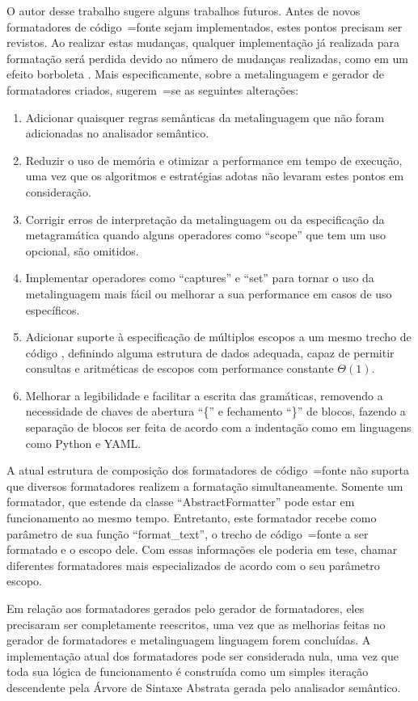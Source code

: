 O autor desse trabalho sugere alguns trabalhos futuros.
Antes de novos formatadores de código~=fonte sejam implementados,
estes pontos precisam ser revistos.
Ao realizar estas mudanças,
qualquer implementação já realizada para formatação será perdida devido ao número de mudanças realizadas,
como em um efeito borboleta \cite{standardButterflyEffect}.
Mais especificamente,
sobre a metalinguagem e
gerador de formatadores criados,
sugerem~=se as seguintes alterações:
\begin{enumerate}
\item Adicionar quaisquer regras semânticas da metalinguagem que não foram adicionadas no analisador semântico.
\item Reduzir o uso de memória e
otimizar a performance em tempo de execução,
uma vez que os algoritmos e
estratégias adotas não levaram estes pontos em consideração.
\item Corrigir erros de interpretação da metalinguagem ou
da especificação da metagramática quando alguns operadores como ``scope'' que tem um uso opcional,
são omitidos.
\item Implementar operadores como ``captures'' e
``set'' para tornar o uso da metalinguagem mais fácil ou
melhorar a sua performance em casos de uso específicos.
\item Adicionar suporte à especificação de múltiplos escopos a um mesmo trecho de código \cite{vsCodeSyntaxHighlighthing},
definindo alguma estrutura de dados adequada,
capaz de permitir consultas e
aritméticas de escopos \cite{textMateScopeExclusion} com performance constante $\Theta(1)$.
\item Melhorar a legibilidade e
facilitar a escrita das gramáticas,
removendo a necessidade de chaves de abertura ``\{'' e
fechamento ``\}'' de blocos,
fazendo a separação de blocos ser feita de acordo com a indentação como em linguagens como Python e
YAML.
\end{enumerate}%

A atual estrutura de composição dos formatadores de código~=fonte não suporta que diversos formatadores realizem a formatação simultaneamente.
Somente um formatador,
que estende da classe ``AbstractFormatter'' pode estar em funcionamento ao mesmo tempo.
Entretanto,
este formatador recebe como parâmetro de sua função ``format\_text'',
o trecho de código~=fonte a ser formatado e
o escopo dele.
Com essas informações ele poderia em tese,
chamar diferentes formatadores mais especializados de acordo com o seu parâmetro escopo.

Em relação aos formatadores gerados pelo gerador de formatadores,
eles precisaram ser completamente reescritos,
uma vez que as melhorias feitas no gerador de formatadores e
metalinguagem linguagem forem concluídas.
A implementação atual dos formatadores pode ser considerada nula,
uma vez que toda sua lógica de funcionamento é construída como um simples iteração descendente pela Árvore de Sintaxe Abstrata gerada pelo analisador semântico.

